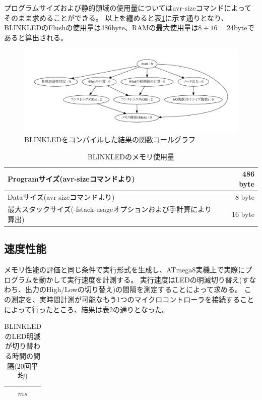 プログラムサイズおよび静的領域の使用量についてはavr-sizeコマンドによってそのまま求めることができる。
以上を纏めると表\ref{fig:imp:size}に示す通りとなり、
BLINKLEDのFlushの使用量は486byte、RAMの最大使用量は$8+16=$24byteであると算出される。

\begin{figure}[h]
 \begin{center}
  \includegraphics[width=160mm]{figure/call_graph.pdf}
 \end{center}
 \caption{BLINKLEDをコンパイルした結果の関数コールグラフ}
 \label{fig:imp:call_graph}
\end{figure}

\begin{table}[h]
  \centering
  \begin{tabular}{l|r}
    Programサイズ(avr-sizeコマンドより) & 486 byte \\ \hline
    Dataサイズ(avr-sizeコマンドより) & 8 byte \\ \hline
    最大スタックサイズ(-fstack-usageオプションおよび手計算により算出)  & 16 byte \\ \hline
  \end{tabular}
\caption{BLINKLEDのメモリ使用量}
\label{fig:imp:size}
\end{table}


\subsection{速度性能}\label{sec:implementation:performance:speed}
メモリ性能の評価と同じ条件で実行形式を生成し、ATmega8実機上で実際にプログラムを動かして実行速度を計測する。
実行速度はLEDの明滅切り替え(すなわち、出力のHigh/Lowの切り替え)の間隔を測定することによって求める。
この測定を、実時間計測が可能なもう1つのマイクロコントローラを接続することによって行ったところ、結果は表\ref{fig:imp:time1}の通りとなった。

\begin{table}[h]
  \centering
  \begin{tabular}{c}
    $ ms$ \\ \hline
  \end{tabular}
\caption{BLINKLEDのLED明滅が切り替わる時間の間隔(20回平均)}
\label{fig:imp:time1}
\end{table}

